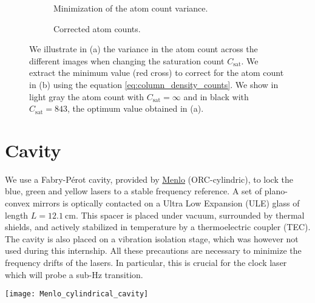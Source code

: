 \documentclass[11pt]{article}
\numberwithin{equation}{section}
\numberwithin{figure}{section}
\begin{document}
%
\begin{figure}[htbp]
	\centering
	\begin{subfigure}[b]{0.48\textwidth}
		\centering
		\small
   		
		\caption{\small Minimization of the atom count variance.}
		\label{fig:high_intensity_var}
	\end{subfigure}
	\begin{subfigure}[b]{0.48\textwidth}
    	\centering
    	\small
   		
		\caption{\small Corrected atom counts.}
		\label{fig:high_intensity_atom_count}
	\end{subfigure}	
	\caption{\small We illustrate in (a) the variance in the atom count across the different images when changing the saturation count $C_\text{sat}$. We extract the minimum value (red cross) to correct for the atom count in (b) using the equation \eqref{eq:column_density_counts}. We show in light gray the atom count with $C_\text{sat} = \infty$ and in black with $C_\text{sat} =843$, the optimum value obtained in (a).}
    \label{fig:high_intensity}
\end{figure}
%

\newpage

\section{Cavity}
\label{sec:cavity_appendix}

\begin{minipage}{0.5\linewidth}
We use a Fabry-Pérot cavity, provided by \href{https://www.menlosystems.com/products/ultrastable-lasers/orc-cylindric-orc-cubic/}{Menlo} (ORC-cylindric), to lock the blue, green and yellow lasers to a stable frequency reference. A set of plano-convex mirrors is optically contacted on a Ultra Low Expansion (ULE) glass of length $L=\SI{12.1}{\centi\metre}$. This spacer is placed under vacuum, surrounded by thermal shields, and actively stabilized in temperature by a thermoelectric coupler (TEC). The cavity is also placed on a vibration isolation stage, which was however not used during this internship. All these precautions are necessary to minimize the frequency drifts of the lasers. In particular, this is crucial for the clock laser which will probe a sub-Hz transition.
\end{minipage} \hfill
\begin{minipage}{0.45\linewidth}
	\centering
	\texttt{[image: Menlo\_cylindrical\_cavity]}
	\label{sphere}
\end{minipage}
\end{document}
